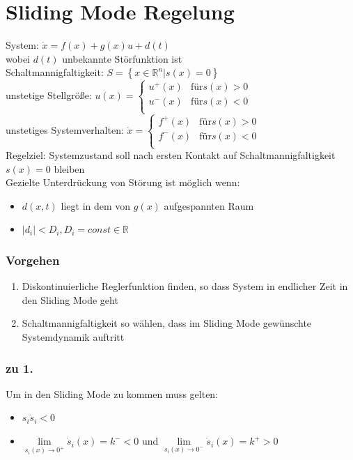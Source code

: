 \documentclass[german]{latex4ei/latex4ei_sheet}
\begin{document}
\section{Sliding Mode Regelung}
\begin{sectionbox}
System: $\dot{x} = f(x) + g(x)u + d(t)$ \\
wobei $d(t)$ unbekannte Störfunktion ist \\
Schaltmannigfaltigkeit: $S = \left\{ x \in \mathbb{R}^n | s(x) = 0 \right\}$ \\
unstetige Stellgröße:
$u(x) =
\begin{cases}
  u^+(x) & \text{für} s(x) > 0 \\
  u^-(x) & \text{für} s(x) < 0 \\
\end{cases}$\\
unstetiges Systemverhalten:
$\dot{x} =
\begin{cases}
  f^+(x) & \text{für} s(x) > 0 \\
  f^-(x) & \text{für} s(x) < 0 \\
\end{cases}$\\
Regelziel: Systemzustand soll nach ersten Kontakt auf Schaltmannigfaltigkeit $s(x) = 0$ bleiben\\
Gezielte Unterdrückung von Störung ist möglich wenn:
\begin{itemize}
  \item $d(x,t)$ liegt in dem von $g(x)$ aufgespannten Raum
  \item $|d_i| < D_i, D_i = const \in \mathbb{R}$
\end{itemize}

\subsubsection{Vorgehen}
\begin{enumerate}
  \item Diskontinuierliche Reglerfunktion finden, so dass System in endlicher Zeit in den Sliding Mode geht
  \item Schaltmannigfaltigkeit so wählen, dass im Sliding Mode gewünschte Systemdynamik auftritt
\end{enumerate}

\subsubsection{zu 1.}
Um in den Sliding Mode zu kommen muss gelten:
\begin{itemize}
  \item $s_i \dot{s}_i < 0$
  \item $\lim\limits_{s_i(x) \rightarrow 0^+} \dot{s}_i(x) = k^- < 0$ und $\lim\limits_{s_i(x) \rightarrow 0^-} \dot{s}_i(x) = k^+ > 0$
\end{itemize}


\end{sectionbox}
\end{document}

